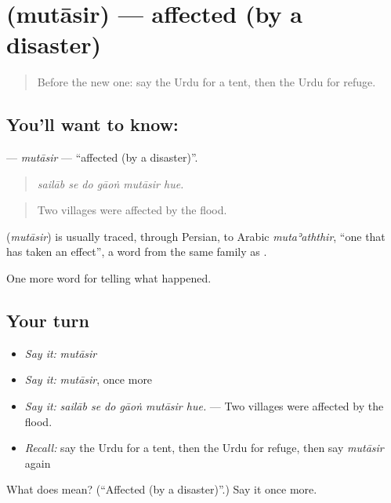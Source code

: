 \section[\texorpdfstring{\ur{متاثر} (mutāsir)}{متاثر (mutāsir)}]{ (mutāsir) — affected (by a disaster)}

\label{lesson:UR-C297-mutasir}



\begin{quote}
Before the new one: say the Urdu for a tent, then the Urdu for refuge.
\end{quote}

\subsection*{You'll want to know: }
\textbf{} — \emph{mutāsir} — \textquotedblleft{}affected (by a disaster)\textquotedblright{}.

\begin{quote}
     
\end{quote}

\begin{quote}
\emph{sailāb se do gāoṅ mutāsir hue.}
\end{quote}

\begin{quote}
Two villages were affected by the flood.
\end{quote}

\begin{cousinweb}
\textbf{} (\emph{mutāsir}) is usually traced, through Persian, to Arabic \emph{mutaʾaththir}, \textquotedblleft{}one that has taken an effect\textquotedblright{}, a word from the same family as \textbf{}.
\end{cousinweb}

\begin{grammarlens}[title={What you've built}]
One more word for telling what happened.
\end{grammarlens}

\subsection*{Your turn}
\begin{itemize}
\raggedright
  \item \emph{Say it:} \emph{mutāsir}
  \item \emph{Say it:} \emph{mutāsir}, once more
  \item \emph{Say it:} \emph{sailāb se do gāoṅ mutāsir hue.} — Two villages were affected by the flood.
  \item \emph{Recall:} say the Urdu for a tent, then the Urdu for refuge, then say \emph{mutāsir} again
\end{itemize}

\begin{tcolorbox}[breakable,colback=teal!4,colframe=teal!35!black,title={Before you move on}]
What does  mean? (\textquotedblleft{}Affected (by a disaster)\textquotedblright{}.) Say it once more.
\end{tcolorbox}
